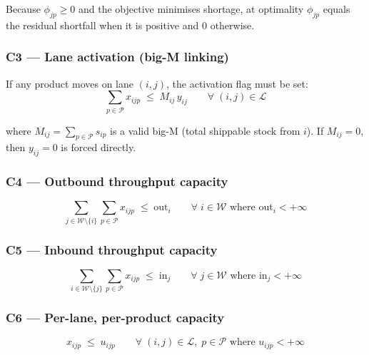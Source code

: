 \documentclass[11pt, a4paper]{article}
\begin{document}
Because $\phi_{jp} \geq 0$ and the objective minimises shortage, at
optimality $\phi_{jp}$ equals the residual shortfall when it is positive
and $0$ otherwise.

\subsubsection*{C3 — Lane activation (big-M linking)}

If any product moves on lane $(i,j)$, the activation flag must be set:
\begin{equation}
  \sum_{p \in \mathcal{P}} x_{ijp}
  \;\leq\;
  M_{ij}\, y_{ij}
  \qquad \forall\; (i,j) \in \mathcal{L}
  \tag{C3}
\end{equation}

where $M_{ij} = \sum_{p \in \mathcal{P}} s_{ip}$ is a valid big-M
(total shippable stock from $i$).  If $M_{ij} = 0$, then $y_{ij} = 0$
is forced directly.

\subsubsection*{C4 — Outbound throughput capacity}

\begin{equation}
  \sum_{j \in \mathcal{W} \setminus \{i\}} \sum_{p \in \mathcal{P}}
    x_{ijp}
  \;\leq\; \text{out}_{i}
  \qquad \forall\; i \in \mathcal{W} \text{ where } \text{out}_{i} < +\infty
  \tag{C4}
\end{equation}

\subsubsection*{C5 — Inbound throughput capacity}

\begin{equation}
  \sum_{i \in \mathcal{W} \setminus \{j\}} \sum_{p \in \mathcal{P}}
    x_{ijp}
  \;\leq\; \text{in}_{j}
  \qquad \forall\; j \in \mathcal{W} \text{ where } \text{in}_{j} < +\infty
  \tag{C5}
\end{equation}

\subsubsection*{C6 — Per-lane, per-product capacity}

\begin{equation}
  x_{ijp} \;\leq\; u_{ijp}
  \qquad \forall\; (i,j) \in \mathcal{L},\; p \in \mathcal{P}
  \text{ where } u_{ijp} < +\infty
  \tag{C6}
\end{equation}
\end{document}
